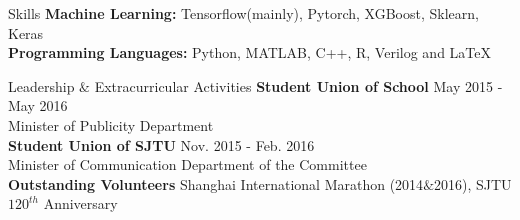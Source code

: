 \documentclass{resume} %
\begin{document}
\begin{rSection}{Skills}
{\bf Machine Learning: }
\hspace*{3.0 cm} Tensorflow(mainly), Pytorch, XGBoost, Sklearn, Keras\\
{\bf Programming Languages: }
\hspace*{1.8 cm} Python, MATLAB, C++, R, Verilog and \LaTeX  \\
\end{rSection}

\begin{rSection}{Leadership $\&$ Extracurricular Activities}
\textbf{Student Union of School} \hfill{May 2015 - May 2016}\\
Minister of Publicity Department  \\
\textbf{Student Union of SJTU} \hfill{Nov. 2015 - Feb. 2016}\\
Minister of Communication Department of the Committee \\
\textbf{Outstanding Volunteers} \hfill{Shanghai International Marathon (2014$\&$2016), SJTU $120^{th}$ Anniversary}
\end{rSection}
\clearpage
\end{document}
